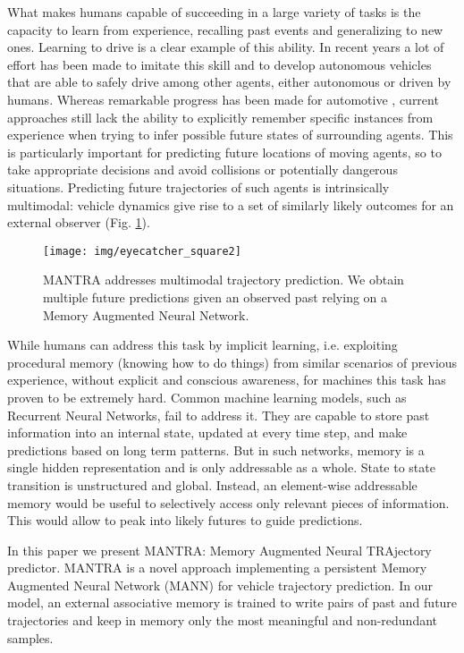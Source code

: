 \documentclass[10pt,twocolumn,letterpaper]{article}
\begin{document}
What makes humans capable of succeeding in a large variety of tasks is the capacity to learn from experience, recalling past events and generalizing to new ones.
Learning to drive is a clear example of this ability. In recent years a lot of effort has been made to imitate this skill and to develop autonomous vehicles that are able to safely drive among other agents, either autonomous or driven by humans. 
Whereas remarkable progress has been made for automotive \cite{bojarski2016end, codevilla2018end, xu2017end}, current approaches still lack the ability to explicitly remember specific instances from experience when trying to infer possible future states of surrounding agents. This is particularly important for predicting future locations of moving agents, so to take appropriate decisions and avoid collisions or potentially dangerous situations. 
Predicting future trajectories of such agents is intrinsically multimodal: vehicle dynamics give rise to a set of similarly likely outcomes for an external observer (Fig. \ref{fig:eyecatcher}).
\begin{figure}[t]
	\centering
	\texttt{[image: img/eyecatcher\_square2]}
	\caption{MANTRA addresses multimodal trajectory prediction. We obtain multiple future predictions given an observed past relying on a Memory Augmented Neural Network.}
	\label{fig:eyecatcher}
\end{figure}

While humans can address this task by implicit learning, i.e. exploiting procedural memory (knowing how to do things) from similar scenarios of previous experience, without explicit and conscious awareness, for machines this task has proven to be extremely hard. Common machine learning models, such as Recurrent Neural Networks, fail to address it. They are capable to store past information into an internal state, updated at every time step, and make predictions based on long term patterns. But in such networks, memory is a single hidden representation and is only addressable as a whole. State to state transition is unstructured and global. Instead, an element-wise addressable memory would be useful to selectively access only relevant pieces of information. This would allow to peak into likely futures to guide predictions.

In this paper we present MANTRA: Memory Augmented Neural TRAjectory predictor. MANTRA is a novel approach implementing a persistent Memory Augmented Neural Network (MANN) for vehicle trajectory prediction.
In our model, an external associative memory is trained to write pairs of past and future trajectories and keep in memory only the most meaningful and non-redundant samples. 
\end{document}
